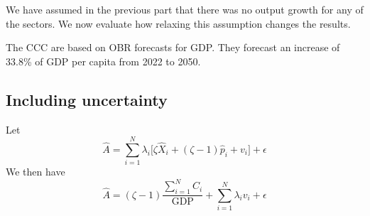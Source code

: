 We have assumed in the previous part that there was no output growth for any of the sectors. We now evaluate how relaxing this assumption changes the results.

The CCC are based on OBR forecasts for GDP. They forecast an increase of 33.8\% of GDP per capita from 2022 to 2050. 



\subsection{Including uncertainty}


Let
\[
\hat{A} = \sum_{i=1}^N \lambda_i \Big[ \zeta \hat{X}_i + (\zeta-1) \hat{p}_i + v_i \Big] + \epsilon
\]
We then have
\[
\hat{A} = (\zeta-1) \frac{\sum_{i=1}^N C_i}{\text{GDP}} + \sum_{i=1}^N \lambda_i v_i + \epsilon
\]

